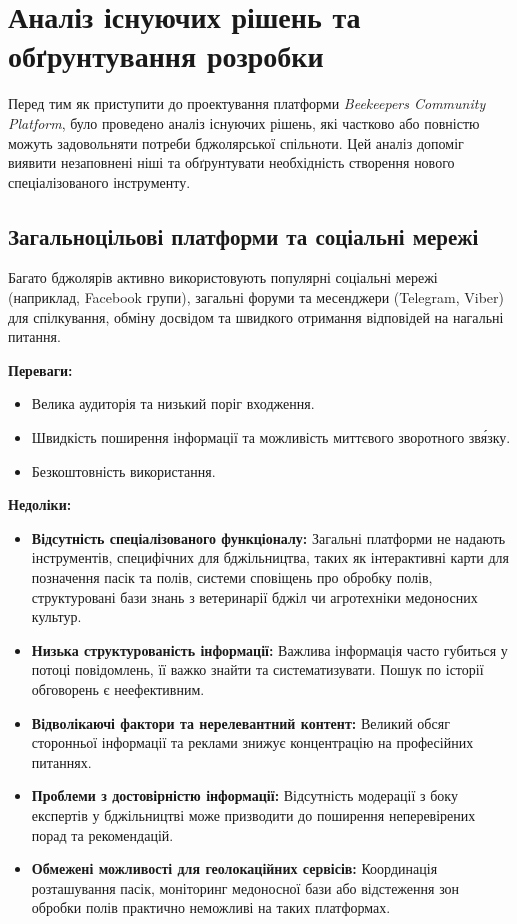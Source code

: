 \section{Аналіз існуючих рішень та обґрунтування розробки}
\label{sec:existing_solutions}
Перед тим як приступити до проектування платформи \textit{Beekeepers Community Platform}, було проведено аналіз існуючих рішень, які частково або повністю можуть задовольняти потреби бджолярської спільноти. Цей аналіз допоміг виявити незаповнені ніші та обґрунтувати необхідність створення нового спеціалізованого інструменту.

\subsection{Загальноцільові платформи та соціальні мережі}
Багато бджолярів активно використовують популярні соціальні мережі (наприклад, Facebook групи), загальні форуми та месенджери (Telegram, Viber) для спілкування, обміну досвідом та швидкого отримання відповідей на нагальні питання. 

\textbf{Переваги:}
\begin{itemize}
    \item Велика аудиторія та низький поріг входження.
    \item Швидкість поширення інформації та можливість миттєвого зворотного зв\'язку.
    \item Безкоштовність використання.
\end{itemize}

\textbf{Недоліки:}
\begin{itemize}
    \item \textbf{Відсутність спеціалізованого функціоналу:} Загальні платформи не надають інструментів, специфічних для бджільництва, таких як інтерактивні карти для позначення пасік та полів, системи сповіщень про обробку полів, структуровані бази знань з ветеринарії бджіл чи агротехніки медоносних культур.
    \item \textbf{Низька структурованість інформації:} Важлива інформація часто губиться у потоці повідомлень, її важко знайти та систематизувати. Пошук по історії обговорень є неефективним.
    \item \textbf{Відволікаючі фактори та нерелевантний контент:} Великий обсяг сторонньої інформації та реклами знижує концентрацію на професійних питаннях.
    \item \textbf{Проблеми з достовірністю інформації:} Відсутність модерації з боку експертів у бджільництві може призводити до поширення неперевірених порад та рекомендацій.
    \item \textbf{Обмежені можливості для геолокаційних сервісів:} Координація розташування пасік, моніторинг медоносної бази або відстеження зон обробки полів практично неможливі на таких платформах.
\end{itemize}


